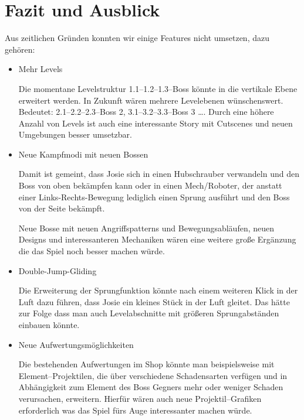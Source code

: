 \chapter{Fazit und Ausblick}\label{ch:fazit}

\label{sec:6_Features}

Aus zeitlichen Gründen konnten wir einige Features nicht umsetzen, dazu gehören:

\begin{itemize}

\item Mehr Levels

Die momentane Levelstruktur 1.1--1.2--1.3--Boss könnte in die vertikale Ebene erweitert werden. In Zukunft wären mehrere Levelebenen wünschenswert. Bedeutet: 2.1--2.2--2.3--Boss 2,  3.1--3.2--3.3--Boss 3 \dots. Durch eine höhere Anzahl von Levels ist auch eine interessante Story mit Cutscenes und neuen Umgebungen besser umsetzbar. 

\item Neue Kampfmodi mit neuen Bossen

Damit ist gemeint, dass Josie sich in einen Hubschrauber verwandeln und den Boss von oben bekämpfen kann oder in einen Mech/Roboter, der anstatt einer Links-Rechts-Bewegung lediglich einen Sprung ausführt und den Boss von der Seite bekämpft.

Neue Bosse mit neuen Angriffspatterns und Bewegungsabläufen, neuen Designs und interessanteren Mechaniken wären eine weitere große Ergänzung die das Spiel noch besser machen würde.

\item Double-Jump-Gliding

Die Erweiterung der Sprungfunktion könnte nach einem weiteren Klick in der Luft dazu führen, dass Josie ein kleines Stück in der Luft gleitet. Das hätte zur Folge dass man auch Levelabschnitte mit größeren Sprungabständen einbauen könnte.

\item Neue Aufwertungsmöglichkeiten

Die bestehenden Aufwertungen im Shop könnte man beispielsweise mit Element--Projektilen, die über verschiedene Schadensarten verfügen und in Abhängigkeit zum Element des Boss Gegners mehr oder weniger Schaden verursachen, erweitern. Hierfür wären auch neue Projektil--Grafiken erforderlich was das Spiel fürs Auge interessanter machen würde.

\end{itemize}
